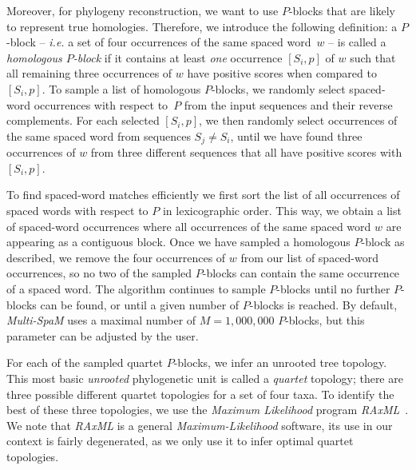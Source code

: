 \documentclass[review]{elsarticle}
\begin{document}
{Moreover, for phylogeny reconstruction, we want to use $P$-blocks that are likely to represent true homologies. Therefore, we introduce the following definition: a $P$-block -- {\em i.e.} a set of four occurrences of the same spaced word~$w$ --  is called a {\em homologous $P$-block} if it contains at least {\em one} occurrence $[S_i,p]$ of $w$  such that all remaining three occurrences of $w$  have positive scores when compared to $[S_i,p]$.  
%
To sample a list of homologous $P$-blocks, we randomly select spaced-word occurrences with respect to~$P$ from the input sequences and their reverse complements. For each selected $[S_i,p]$, we then randomly select occurrences of the same spaced word from sequences $S_j \not= S_i$, until we have found three occurrences of $w$ from three different sequences that all have positive scores with $[S_i,p]$.
%


%




To find spaced-word matches efficiently  we
first sort the list of all occurrences of spaced words with respect to $P$ in lexicographic order. This way, we obtain a list of spaced-word occurrences where all occurrences of the same spaced word $w$ are appearing as a contiguous block. 
Once we have sampled a homologous $P$-block as described, we remove the four occurrences of $w$ from our list of spaced-word occurrences, so no two of the sampled $P$-blocks can contain the same occurrence of a spaced word. 
%
The algorithm continues to sample $P$-blocks until no further $P$-blocks can be found, or until a given number 
of  $P$-blocks is reached. By default, {\em Multi-SpaM} uses a maximal number of $M=1,000,000$ $P$-blocks, but this parameter can be adjusted by the user.  


{For each of the sampled quartet $P$-blocks, we infer an unrooted tree topology. This most basic {\em unrooted} phylogenetic unit is called a \textit{quartet} topology; there are three possible different quartet
topologies for a set of four taxa.  
To identify the best of these three topologies, we use the {\em Maximum Likelihood} program {\em RAxML}~\cite{sta:14}.  We note that 
{\em RAxML} is a general {\em Maximum-Likelihood} software, its use in our context is fairly degenerated, as we only use it to 
infer optimal quartet topologies.}\\

}
\end{document}
